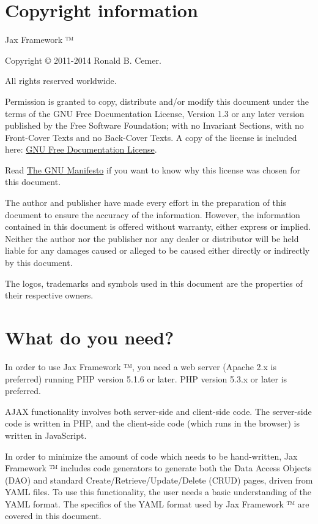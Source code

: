 \documentclass[letterpaper,10pt,english]{sphinxmanual}
\begin{document}
\section{Copyright information}
\label{jaxFrameworkGuide:copyright-information}
Jax Framework ™

Copyright © 2011-2014 Ronald B. Cemer.

All rights reserved worldwide.

Permission is granted to copy, distribute and/or modify this document
under the terms of the GNU Free Documentation License, Version 1.3 or any later
version published by the Free Software Foundation; with no Invariant
Sections, with no Front-Cover Texts and no Back-Cover Texts.  A copy of the
license is included here: \href{http://www.gnu.org/copyleft/fdl.html}{GNU Free
Documentation License}.

Read \href{http://www.fsf.org/gnu/manifesto.html}{The GNU Manifesto} if you want to know why this
license was chosen for this document.

The author and publisher have made every effort in the preparation of this
document to ensure the accuracy of the information.  However, the information
contained in this document is offered without warranty, either express or implied.
Neither the author nor the publisher nor any dealer or distributor will be held
liable for any damages caused or alleged to be caused either directly or
indirectly by this document.

The logos, trademarks and symbols used in this document are the properties of
their respective owners.


\section{What do you need?}
\label{jaxFrameworkGuide:what-do-you-need}
In order to use Jax Framework ™, you need a web server (Apache 2.x is preferred) running PHP
version 5.1.6 or later.  PHP version 5.3.x or later is preferred.

AJAX functionality involves both server-side and client-side code.  The server-side code is written
in PHP, and the client-side code (which runs in the browser) is written in JavaScript.

In order to minimize the amount of code which needs to be hand-written, Jax Framework ™
includes code generators to generate both the Data Access Objects (DAO) and standard
Create/Retrieve/Update/Delete (CRUD) pages, driven from YAML files.  To use this functionality, the
user needs a basic understanding of the YAML format.  The specifics of the YAML format used by Jax
Framework ™ are covered in this document.
\end{document}
